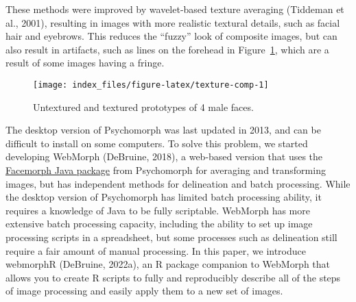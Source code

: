 \documentclass[
  doc,floatsintext]{apa6}
\begin{document}
These methods were improved by wavelet-based texture averaging (Tiddeman et al., 2001), resulting in images with more realistic textural details, such as facial hair and eyebrows. This reduces the ``fuzzy'' look of composite images, but can also result in artifacts, such as lines on the forehead in Figure~\ref{fig:texture-comp}, which are a result of some images having a fringe.

\begin{figure}
\texttt{[image: index\_files/figure-latex/texture-comp-1]} \caption{Untextured and textured prototypes of 4 male faces.}\label{fig:texture-comp}
\end{figure}

The desktop version of Psychomorph was last updated in 2013, and can be difficult to install on some computers. To solve this problem, we started developing WebMorph (DeBruine, 2018), a web-based version that uses the \href{https://users.aber.ac.uk/bpt/jpsychomorph/version6/javadoc/}{Facemorph Java package} from Psychomorph for averaging and transforming images, but has independent methods for delineation and batch processing. While the desktop version of Psychomorph has limited batch processing ability, it requires a knowledge of Java to be fully scriptable. WebMorph has more extensive batch processing capacity, including the ability to set up image processing scripts in a spreadsheet, but some processes such as delineation still require a fair amount of manual processing. In this paper, we introduce webmorphR (DeBruine, 2022a), an R package companion to WebMorph that allows you to create R scripts to fully and reproducibly describe all of the steps of image processing and easily apply them to a new set of images.
\end{document}
